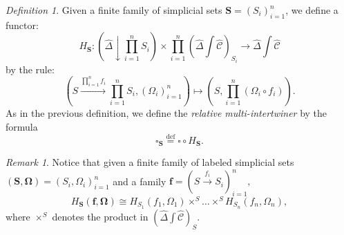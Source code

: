 \documentclass[leqno]{article}
\numberwithin{equation}{subsection}
\theoremstyle{plain}   %
\theoremstyle{remark}
\newtheorem{rem}[equation]{Remark}
\newtheorem{defn}[equation]{Definition}
\theoremstyle{plain}
\newcommand{\overcat}[2]{{\left(#1\downarrow #2\right)}}
\newcommand{\psh}[1]{\ensuremath{\widehat{#1}}}
\newcommand{\defeq}{\overset{\mathrm{def}}=}
\newcommand{\ssetlab}{\ensuremath{\widehat{\Delta} \int \widehat{\mathcal{C}}}}
\begin{document}
\begin{defn}\label{productintertwiner}
	Given a finite family of simplicial sets \(\mathbf{S}=(S_i)_{i=1}^n\), we define a functor:
	\[H_{\mathbf{S}}: \overcat{\psh{\Delta}}{\prod_{i=1}^n S_i} \times  \prod_{i=1}^n\left(\ssetlab\right)_{S_i} \to \ssetlab\] by the rule:
	\[\left(S \xrightarrow{\prod^n_{i=1} f_i} \prod_{i=1}^n S_i, (\Omega_i)_{i=1}^n\right)\mapsto \left(S,\prod_{i=1}^n (\Omega_i\circ f_i)\right).\]
	As in the previous definition, we define the \emph{relative multi-intertwiner} by the formula
	\[\square_{\mathbf{S}} \defeq \square \circ H_\mathbf{S}.\]
\end{defn}

\begin{rem} 
	Notice that given a finite family of labeled simplicial sets \((\mathbf{S},\mathbf{\Omega})=(S_i,\Omega_i)_{i=1}^n\) and a family \(\mathbf{f}=\left(S\xrightarrow{f_i} S_i\right)^n_{i=1},\) 
	\[H_{\mathbf{S}}(\mathbf{f},\mathbf{\Omega})\cong H_{S_1}(f_1, \Omega_1) \times^S \dots \times^S H_{S_n}(f_n,\Omega_n),\]
	where \(\times^S\) denotes the product in \(\left(\ssetlab\right)_S\).
\end{rem}
\end{document}
